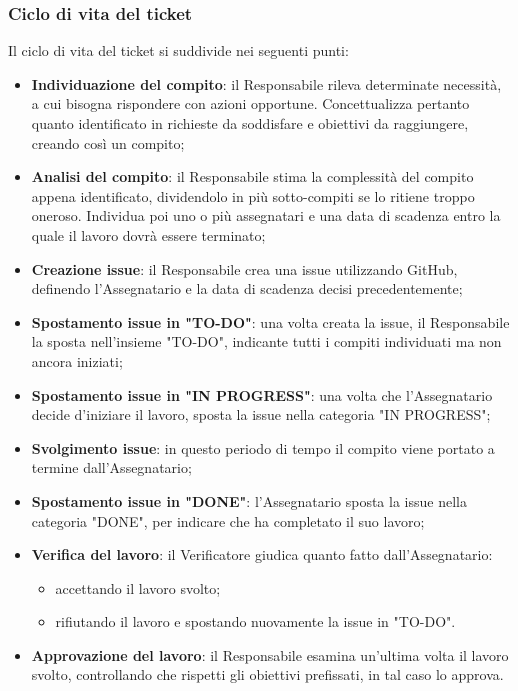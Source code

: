 \subsubsection{Ciclo di vita del ticket}
Il ciclo di vita del ticket si suddivide nei seguenti punti:
\begin {itemize}
    \item \textbf{Individuazione del compito}: il Responsabile rileva determinate necessità, a cui bisogna rispondere con azioni opportune. Concettualizza pertanto quanto identificato in richieste da soddisfare e obiettivi da raggiungere, creando così un compito;
    \item \textbf{Analisi del compito}: il Responsabile stima la complessità del compito appena identificato, dividendolo in più sotto-compiti se lo ritiene troppo oneroso. Individua poi uno o più assegnatari e una data di scadenza entro la quale il lavoro dovrà essere terminato;
    \item \textbf{Creazione issue}: il Responsabile crea una issue utilizzando GitHub, definendo l’Assegnatario e la data di scadenza decisi precedentemente;
    \item \textbf{Spostamento issue in "TO-DO"}: una volta creata la issue, il Responsabile la sposta nell’insieme "TO-DO", indicante tutti i compiti individuati ma non ancora iniziati;
    \item \textbf{Spostamento issue in "IN PROGRESS"}: una volta che l’Assegnatario decide d'iniziare il lavoro, sposta la issue nella categoria "IN PROGRESS";
    \item \textbf{Svolgimento issue}: in questo periodo di tempo il compito viene portato a termine dall'Assegnatario;
    \item \textbf{Spostamento issue in "DONE"}: l’Assegnatario sposta la issue nella categoria "DONE", per indicare che ha completato il suo lavoro;
    \item \textbf{Verifica del lavoro}: il Verificatore giudica quanto fatto dall’Assegnatario:
    \begin {itemize}
        \item accettando il lavoro svolto;
        \item rifiutando il lavoro e spostando nuovamente la issue in "TO-DO".
    \end {itemize}
    \item \textbf{Approvazione del lavoro}: il Responsabile esamina un’ultima volta il lavoro svolto, controllando che rispetti gli obiettivi prefissati, in tal caso lo approva.
\end {itemize}
